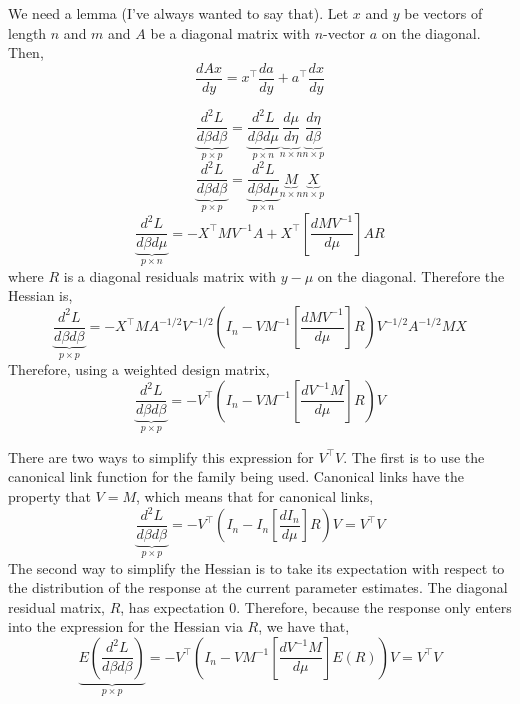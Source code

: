 \documentclass{jss}
\begin{document}
We need a lemma (I've always wanted to say that). Let $x$ and $y$ be
vectors of length $n$ and $m$ and $A$ be a diagonal matrix with
$n$-vector $a$ on the diagonal. Then,
\begin{equation}
  \frac{dAx}{dy} = x^\top \frac{da}{dy} + a^\top \frac{dx}{dy}
\end{equation}

\begin{equation}
\underbrace{\frac{d^2 L}{d\beta d\beta}}_{p\times p} = 
\underbrace{\frac{d^2 L}{d\beta d\mu}}_{p\times n}
\underbrace{\frac{d\mu}{d\eta}}_{n\times n}
\underbrace{\frac{d\eta}{d\beta}}_{n\times p}
\end{equation}
\begin{equation}
\underbrace{\frac{d^2 L}{d\beta d\beta}}_{p\times p} = 
\underbrace{\frac{d^2 L}{d\beta d\mu}}_{p\times n}
\underbrace{M}_{n\times n}
\underbrace{X}_{n\times p}
\end{equation}
\begin{equation}
\underbrace{\frac{d^2 L}{d\beta d\mu}}_{p\times n} =
-X^\top M V^{-1} A  + 
X^\top \left[ \frac{dMV^{-1}}{d\mu} \right] A R
\end{equation}
where $R$ is a diagonal residuals matrix with $y-\mu$ on the
diagonal. Therefore the Hessian is,
\begin{equation}
\underbrace{\frac{d^2 L}{d\beta d\beta}}_{p\times p} = 
-X^\top M A^{-1/2}V^{-1/2}\left( 
I_n - 
VM^{-1}\left[ \frac{dMV^{-1}}{d\mu} \right] R
\right)V^{-1/2}A^{-1/2} M X
\label{eq:betaHessian}
\end{equation}
Therefore, using a weighted design matrix,
\begin{equation}
\underbrace{\frac{d^2 L}{d\beta d\beta}}_{p\times p} = 
-V^\top\left( 
I_n - 
VM^{-1}\left[ \frac{dV^{-1}M}{d\mu} \right] R
\right)V
\label{eq:betaHessian}
\end{equation}

There are two ways to simplify this expression for $V^\top V$. The
first is to use the canonical link function for the family being
used. Canonical links have the property that $V = M$, which means that
for canonical links,
\begin{equation}
  \underbrace{\frac{d^2 L}{d\beta d\beta}}_{p\times p} = 
  -V^\top\left( 
    I_n - 
    I_n \left[ \frac{dI_n}{d\mu} \right] R
  \right)V = V^\top V
\end{equation}
The second way to simplify the Hessian is to take its expectation with
respect to the distribution of the response at the current parameter
estimates. The diagonal residual matrix, $R$, has expectation
0. Therefore, because the response only enters into the expression for
the Hessian via $R$, we have that,
\begin{equation}
  \underbrace{E\left(\frac{d^2 L}{d\beta d\beta}\right)}_{p\times p} = 
  -V^\top\left( 
    I_n - 
    VM^{-1}\left[ \frac{dV^{-1}M}{d\mu} \right] E(R)
  \right)V = V^\top V
\label{eq:betaHessian}
\end{equation}
\end{document}
